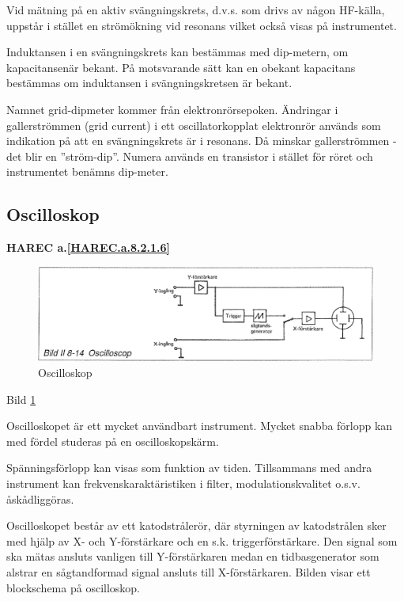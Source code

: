 Vid mätning på en aktiv svängningskrets, d.v.s. som drivs av någon
HF-källa, uppstår i stället en strömökning vid resonans vilket också
visas på instrumentet.

Induktansen i en svängningskrets kan bestämmas med dip-metern, om
kapacitansenär bekant. På motsvarande sätt kan en obekant kapacitans
bestämmas om induktansen i svängningskretsen är bekant.

Namnet grid-dipmeter kommer från elektronrörsepoken. Ändringar i
gallerströmmen (grid current) i ett oscillatorkopplat elektronrör
används som indikation på att en svängningskrets är i resonans. Då
minskar gallerströmmen - det blir en ''ström-dip''.  Numera används en
transistor i stället för röret och instrumentet benämns dip-meter.

\subsection{Oscilloskop}
\textbf{
HAREC a.\ref{HAREC.a.8.2.1.6}\label{myHAREC.a.8.2.1.6}
}

\begin{rev-omarbetas}
\begin{figure}
  \includegraphics[width=\textwidth]{images/bild_2_8-14}
  \caption{Oscilloskop}
  \label{fig:bildII8-14}
\end{figure}

Bild \ref{fig:bildII8-14}

Oscilloskopet är ett mycket användbart instrument. Mycket snabba
förlopp kan med fördel studeras på en oscilloskopskärm.

Spänningsförlopp kan visas som funktion av tiden. Tillsammans med
andra instrument kan frekvenskaraktäristiken i filter,
modulationskvalitet o.s.v. åskådliggöras.

Oscilloskopet består av ett katodstrålerör, där styrningen av
katodstrålen sker med hjälp av X- och Y-förstärkare och en s.k.
triggerförstärkare. Den signal som ska mätas ansluts vanligen till
Y-förstärkaren medan en tidbasgenerator som alstrar en sågtandformad
signal ansluts till X-förstärkaren.  Bilden visar ett blockschema på
oscilloskop.
\end{rev-omarbetas}

